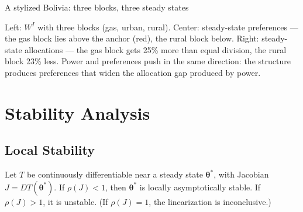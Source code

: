 \documentclass[../structural_economics_book.tex]{subfiles}
\begin{document}
\begin{vizpanel}{A stylized Bolivia: three blocks, three steady states}
\begin{center}
\end{center}
\vspace{-0.5em}
\small Left: $W^I$ with three blocks (gas, urban, rural). Center: steady-state preferences --- the gas block lies above the anchor (red), the rural block below. Right: steady-state allocations --- the gas block gets 25\% more than equal division, the rural block 23\% less. Power and preferences push in the same direction: the structure produces preferences that widen the allocation gap produced by power.
\end{vizpanel}


\section{Stability Analysis}
\label{ch10:sec:stability}

\subsection{Local Stability}

\begin{theorem}\label{ch10:thm:stability}
Let $T$ be continuously differentiable near a steady state $\boldsymbol{\theta}^*$, with Jacobian $J = DT(\boldsymbol{\theta}^*)$. If $\rho(J) < 1$, then $\boldsymbol{\theta}^*$ is locally asymptotically stable. If $\rho(J) > 1$, it is unstable. (If $\rho(J) = 1$, the linearization is inconclusive.)
\end{theorem}
\end{document}
